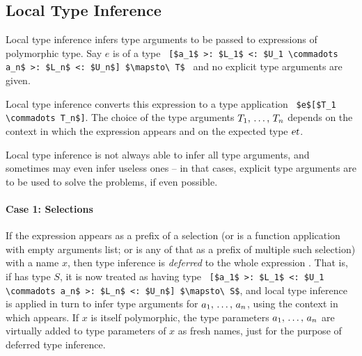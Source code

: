 






\subsection{Local Type Inference}
\label{sec:local-type-inference}

Local type inference infers type arguments to be passed to expressions of polymorphic type. Say $e$ is of a type ~\lstinline![$a_1$ >: $L_1$ <: $U_1 \commadots a_n$ >: $L_n$ <: $U_n$] $\mapsto\ T$!~ and no explicit type arguments are given. 

Local type inference converts this expression to a type application ~\lstinline!$e$[$T_1 \commadots T_n$]!. The choice of the type arguments $T_1 ,\, \ldots ,\, T_n$ depends on the context in which the expression appears and on the expected type $\mbox{\sl et}$. 

Local type inference is not always able to infer all type arguments, and sometimes may even infer useless ones -- in that cases, explicit type arguments are to be used to solve the problems, if even possible. 

\paragraph{Case 1: Selections}
If the expression appears as a prefix of a selection (or is a function application with empty arguments list; or is any of that as a prefix of multiple such selection) with a name $x$, then type inference is {\em deferred} to the whole expression . That is, if  has type $S$, it is now treated as having type ~\lstinline![$a_1$ >: $L_1$ <: $U_1 \commadots a_n$ >: $L_n$ <: $U_n$] $\mapsto\ S$!, and local type inference is applied in turn to infer type arguments for $a_1 ,\, \ldots ,\, a_n$, using the context in which  appears. If $x$ is itself polymorphic, the type parameters $a_1 ,\, \ldots ,\, a_n$ are virtually added to type parameters of $x$ as fresh names, just for the purpose of deferred type inference. 

